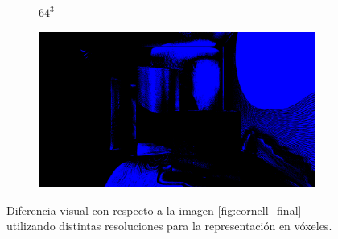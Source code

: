 \begin{figure}[H]
\begin{subfigure}[b]{.49\linewidth}
		\caption*{$64^3$}
	\end{subfigure}%
	\hspace{0.01\textwidth}
	\begin{subfigure}[b]{.49\linewidth}
		\centering
		\captionsetup{justification=centering}
		\includegraphics[width=\linewidth]{media/finals/cornell_gi_64_diff.png}
		\caption*{}
	\end{subfigure}%
	\caption{Diferencia visual con respecto a la imagen \ref{fig:cornell_final} utilizando distintas resoluciones para la representación en vóxeles.}
	\label{fig:cornell_gi_resdiff}
\end{figure}

